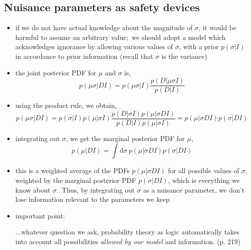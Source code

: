 \documentclass[../jaynes_prob_theory_notes.tex]{subfiles}
\begin{document}
        \subsection{Nuisance parameters as safety devices}
            \begin{itemize}
                \item if we do not have actual knowledge about the magnitude of $\sigma$, it would be harmful to assume an arbitrary value;\ we should adopt a model which acknowledges ignorance by allowing various values of $\sigma$, with a prior $p(\sigma|I)$ in accordance to prior information (recall that $\sigma$ is the variance)
                \item the joint posterior PDF for $\mu$ and $\sigma$ is,
                    \begin{equation*}
                        p({\mu}{\sigma}|DI) = p({\mu}{\sigma}|I) \frac{p(D|{\mu}{\sigma}I)}{p(D|I)}
                    \end{equation*}
                \item using the product rule, we obtain,
                    \begin{equation*}
                        p({\mu}{\sigma}|DI) = p({\sigma}|I)p({\mu}|{\sigma}I) \frac{p(D|{\sigma}I)p({\mu}|{\sigma}DI)}{p(D|I)p({\mu}|{\sigma}I)} = p({\mu}|{\sigma}DI)p({\sigma}|DI)
                    \end{equation*}
                \item integrating out $\sigma$, we get the marginal posterior PDF for $\mu$,
                    \begin{equation*}
                        p({\mu}|DI) = \int \mathrm{d}{\sigma}~p({\mu}|{\sigma}DI)p({\sigma}|DI)
                    \end{equation*}
                \item this is a weighted average of the PDFs $p({\mu}|{\sigma}DI)$ for all possible values of $\sigma$, weighted by the marginal posterior PDF $p({\sigma}|DI)$, which is everything we know about $\sigma$.\ Thus, by integrating out $\sigma$ as a nuisance parameter, we don't lose information relevant to the parameters we keep
                \item important point:
                    \begin{displayquote}
                        $\ldots$whatever question we ask, probability theory as logic automatically takes into account all possibilities \textit{allowed by our model} and information. (p. 219)
                    \end{displayquote}
            \end{itemize}
        
\end{document}
